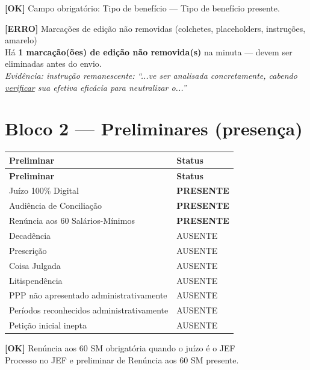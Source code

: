 \documentclass[12pt,a4paper]{article}
\newcommand{\statusOK}[1]{\textcolor{corOK}{\textbf{[OK]}} #1}
\newcommand{\statusERRO}[1]{\textcolor{corERRO}{\textbf{[ERRO]}} #1}
\begin{document}
\medskip
\statusOK{Campo obrigatório: Tipo de benefício} --- Tipo de benefício presente.

\medskip
\statusERRO{Marcações de edição não removidas (colchetes, placeholders, instruções, amarelo)}\\
Há \textbf{1 marcação(ões) de edição não removida(s)} na minuta --- devem ser eliminadas antes do envio.\\
\textit{Evidência: instrução remanescente: ``...ve ser analisada concretamente, cabendo \underline{verificar} sua efetiva eficácia para neutralizar o...''}

\section{Bloco 2 --- Preliminares (presença)}

\begin{longtable}{p{8.5cm} p{4.5cm}}
  \toprule
  \textbf{Preliminar} & \textbf{Status} \\
  \midrule
  \endfirsthead
  \toprule
  \textbf{Preliminar} & \textbf{Status} \\
  \midrule
  \endhead
  Juízo 100\% Digital                         & \textcolor{corOK}{\textbf{PRESENTE}} \\
  Audiência de Conciliação                    & \textcolor{corOK}{\textbf{PRESENTE}} \\
  Renúncia aos 60 Salários-Mínimos            & \textcolor{corOK}{\textbf{PRESENTE}} \\
  Decadência                                  & AUSENTE \\
  Prescrição                                  & AUSENTE \\
  Coisa Julgada                               & AUSENTE \\
  Litispendência                              & AUSENTE \\
  PPP não apresentado administrativamente     & AUSENTE \\
  Períodos reconhecidos administrativamente   & AUSENTE \\
  Petição inicial inepta                      & AUSENTE \\
  \bottomrule
\end{longtable}

\statusOK{Renúncia aos 60 SM obrigatória quando o juízo é o JEF}\\
Processo no JEF e preliminar de Renúncia aos 60 SM presente.
\end{document}
